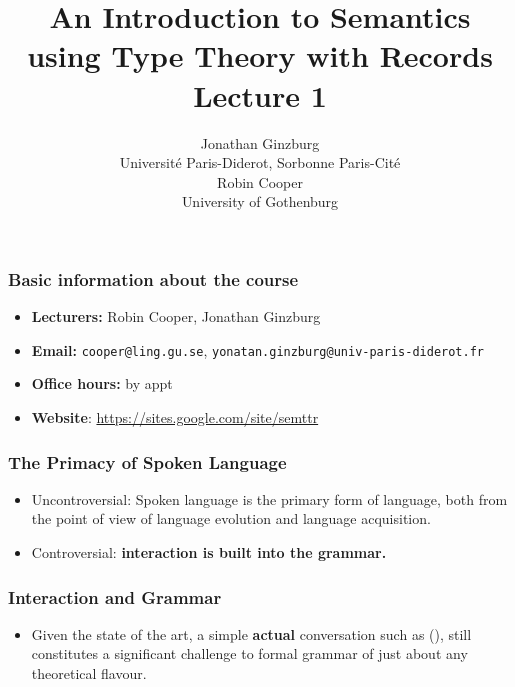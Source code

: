 \documentclass{beamer}
\title{An Introduction to  Semantics using Type Theory with Records\\
  Lecture 1           }
\author{Jonathan Ginzburg\\
Universit\'e Paris-Diderot, Sorbonne Paris-Cit\'e\\
Robin Cooper\\ 
University of Gothenburg}
\date{}
\newcommand{\bit}{\begin{itemize}}
\newcommand{\eit}{\end{itemize}}
\newcommand{\ignore}[1]{}
\begin{document}
\frame[plain]{\titlepage}

\begin{frame}\frametitle{ Basic information about the course      }





\begin{itemize}
\item[] {\bf Lecturers:} Robin Cooper, Jonathan Ginzburg



\item[] {\bf Email:} {\tt cooper@ling.gu.se}, {\tt yonatan.ginzburg@univ-paris-diderot.fr}

\item[] {\bf Office hours:} by appt

\item[] {\bf Website}:  \url{https://sites.google.com/site/semttr}



\end{itemize}

\end{frame}


\begin{frame}\frametitle{     The Primacy of  Spoken Language }

\bit

\item Uncontroversial: Spoken language is the primary form of language, both from the
  point of view of language evolution and language acquisition.

\item Controversial: {\bf interaction is built
  into the grammar.}

\eit
\end{frame}




\begin{frame}\frametitle{ Interaction and Grammar}
\bit
\ignore{\item Few would seriously dispute the importance of studying
conversational interaction. 

\item The dominant paradigms in grammar and semantics have, on the
whole, abstracted away from interaction, viewing it as somebody else's problem.
}
\item Given the state of the art, a simple {\bf actual} conversation such as (), still constitutes a significant
challenge to formal grammar of just about any theoretical
flavour.

\eit
\end{frame}
\end{document}
